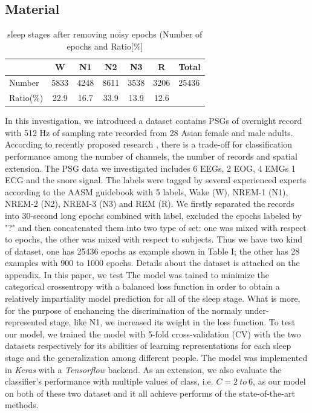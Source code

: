 \documentclass[journal]{IEEEtran}
\begin{document}
\subsection{Material}

\begin{table}[!t]
\renewcommand{\arraystretch}{1.3}
\caption{sleep stages after removing noisy epochs (Number of epochs and Ratio[\%]}
\centering
\begin{tabular}{lcccccl}
\toprule
  & W & N1 & N2 & N3 & R & Total \\
\midrule
 Number & 5833 & 4248 & 8611 & 3538 & 3206 & 25436\\
 Ratio(\%) & 22.9 & 16.7 & 33.9 & 13.9 & 12.6 &\\ 
\end{tabular}
\end{table}

In this investigation, we introduced a dataset contains PSGs of overnight record with 512 Hz of sampling rate recorded from 28 Asian female and male adults. According to recently proposed research \cite{chambon2017deep}, there is a trade-off for classification performance among the number of channels, the number of records and spatial extension. The PSG data we investigated includes 6 EEGs, 2 EOG, 4 EMGs 1 ECG and the snore signal. The labels were tagged by several experienced experts according to the AASM guidebook with 5 labels, Wake (W), NREM-1 (N1), NREM-2 (N2), NREM-3 (N3) and REM (R). We firstly separated the records into 30-second long epochs combined with label, excluded the epochs labeled by "?" and then concatenated them into two type of set: one was mixed with respect to epochs, the other was mixed with respect to subjects. Thus we have two kind of dataset, one has 25436 epochs as example shown in Table I; the other has 28 examples with 900 to 1000 epochs. Details about the dataset is attached on the appendix. In this paper, we test The model was tained to minimize the categorical crossentropy with a balanced loss function in order to obtain a relatively impartiality model prediction for all of the sleep stage. What is more, for the purpose of enchancing the discrimination of the normaly under-represented stage, like N1, we increased its weight in the loss function. To test our model, we trained the model with 5-fold cross-validation (CV) with the two datasets respectively for its abilities of learning representations for each sleep stage and the generalization among different people. The model was implemented in \emph{Keras} with a \emph{Tensorflow} backend. As an extension, we also evaluate the classifier's performance with multiple values of class, i.e. $C = 2\ to\ 6$, as our model on both of these two dataset and it all achieve performs of the state-of-the-art methods.
\end{document}
